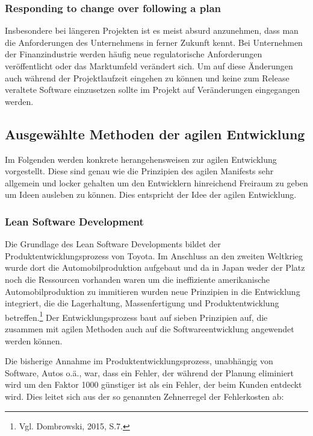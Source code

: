             \subsubsection{Responding to change over following a plan}

                Insbesondere bei längeren Projekten ist es meist absurd anzunehmen, dass man die Anforderungen des Unternehmens in ferner Zukunft kennt. Bei Unternehmen der Finanzindustrie werden häufig neue regulatorische Anforderungen veröffentlicht oder das Marktumfeld verändert sich. Um auf diese Änderungen auch während der Projektlaufzeit eingehen zu können und keine zum Release veraltete Software einzusetzen sollte im Projekt auf Veränderungen eingegangen werden.

        \subsection{Ausgewählte Methoden der agilen Entwicklung}

            Im Folgenden werden konkrete herangehensweisen zur agilen Entwicklung vorgestellt. Diese sind genau wie die Prinzipien des agilen Manifests sehr allgemein und locker gehalten um den Entwicklern hinreichend Freiraum zu geben um Ideen ausleben zu können. Dies entspricht der Idee der agilen Entwicklung.

            \subsubsection{Lean Software Development}

                Die Grundlage des Lean Software Developments bildet der Produktentwicklungsprozess von Toyota. Im Anschluss an den zweiten Weltkrieg wurde dort die Automobilproduktion aufgebaut und da in Japan weder der Platz noch die Ressourcen vorhanden waren um die ineffiziente amerikanische Automobilproduktion zu immitieren wurden neue Prinzipien in die Entwicklung integriert, die die Lagerhaltung, Massenfertigung und Produktentwicklung betreffen.\footnote{Vgl. Dombrowski, 2015, S.7.} Der Entwicklungsprozess baut auf sieben Prinzipien auf, die zusammen mit agilen Methoden auch auf die Softwareentwicklung angewendet werden können.

                Die bisherige Annahme im Produktentwicklungsprozess, unabhängig von Software, Autos o.ä., war, dass ein Fehler, der während der Planung eliminiert wird um den Faktor 1000 günstiger ist als ein Fehler, der beim Kunden entdeckt wird. Dies leitet sich aus der so genannten Zehnerregel der Fehlerkosten ab:

